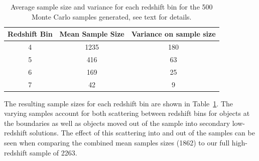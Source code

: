 \begin{table}
\centering
\caption[Average sample size and variance for each redshift bin for the 500 Monte Carlo samples.]{Average sample size and variance for each redshift bin for the 500 Monte Carlo samples generated, see text for details.}
\label{tab:samplesizes}
\begin{tabular}{@{}ccc}
\hline
 Redshift Bin & Mean Sample Size & Variance on sample size  \\
  \hline
 4 & 1235 & 180 \\
 5 & 416 & 63 \\
 6 & 169 & 25 \\
 7 & 42 & 9 \\
 \hline
\end{tabular}
\end{table}

The resulting sample sizes for each redshift bin are shown in Table~\ref{tab:samplesizes}. The varying samples account for both scattering between redshift bins for objects at the boundaries as well as objects moved out of the sample into secondary low-redshift solutions. The effect of this scattering into and out of the samples can be seen when comparing the combined mean samples sizes (1862) to our full high-redshift sample of 2263.

